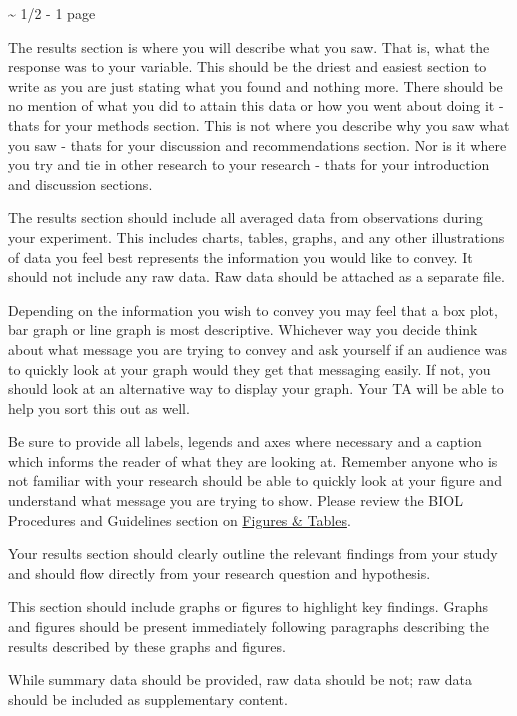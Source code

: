 \documentclass[
]{book}
\begin{document}
\textasciitilde{} 1/2 - 1 page

The results section is where you will describe what you saw. That is, what the response was to your variable. This should be the driest and easiest section to write as you are just stating what you found and nothing more. There should be no mention of what you did to attain this data or how you went about doing it - that\textquotesingle s for your methods section. This is not where you describe why you saw what you saw - that\textquotesingle s for your discussion and recommendations section. Nor is it where you try and tie in other research to your research - that\textquotesingle s for your introduction and discussion sections.

The results section should include all averaged data from observations during your experiment. This includes charts, tables, graphs, and any other illustrations of data you feel best represents the information you would like to convey. It should not include any raw data. Raw data should be attached as a separate file.

Depending on the information you wish to convey you may feel that a box plot, bar graph or line graph is most descriptive. Whichever way you decide think about what message you are trying to convey and ask yourself if an audience was to quickly look at your graph would they get that messaging easily. If not, you should look at an alternative way to display your graph. Your TA will be able to help you sort this out as well.

Be sure to provide all labels, legends and axes where necessary and a caption which informs the reader of what they are looking at. Remember anyone who is not familiar with your research should be able to quickly look at your figure and understand what message you are trying to show. Please review the BIOL Procedures and Guidelines section on \href{https://ubco-biology.github.io/Procedures-and-Guidelines/figures-tables.html}{Figures \& Tables}.

Your results section should clearly outline the relevant findings from your study and should flow directly from your research question and hypothesis.

This section should include graphs or figures to highlight key findings. Graphs and figures should be present immediately following paragraphs describing the results described by these graphs and figures.

While summary data should be provided, raw data should be not; raw data should be included as supplementary content.
\end{document}
